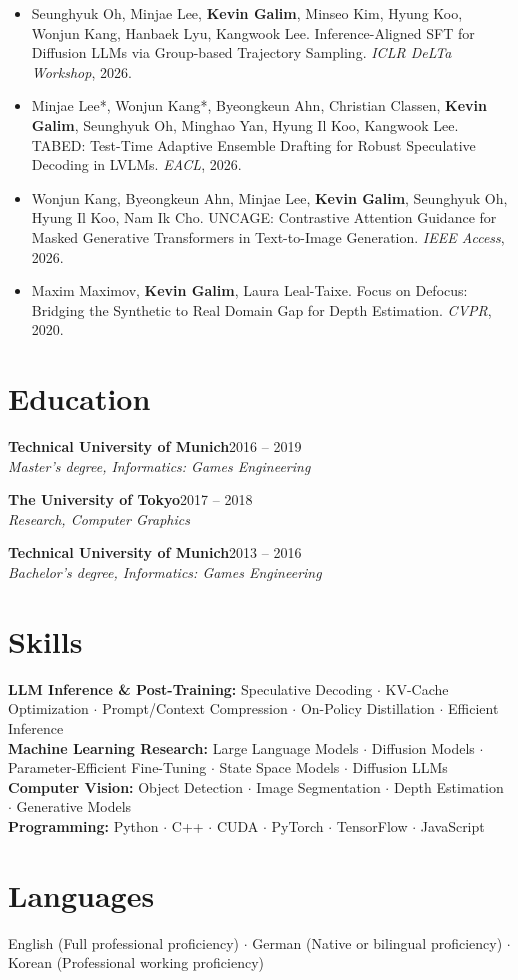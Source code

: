\documentclass[10pt,a4paper]{article}
\newcommand{\cvevent}[4]{%
  \noindent\textbf{#1}\hfill{\small\color{lightgray}#3}\\
  \textit{#2}\hfill{\small\color{lightgray}#4}
  \vspace{2pt}
}
\begin{document}
\begin{itemize}[leftmargin=1.2em]
  \item Seunghyuk Oh, Minjae Lee, \textbf{Kevin Galim}, Minseo Kim, Hyung Koo, Wonjun Kang, Hanbaek Lyu, Kangwook Lee.
Inference-Aligned SFT for Diffusion LLMs via Group-based Trajectory Sampling.
\textit{ICLR DeLTa Workshop}, 2026.
  \item Minjae Lee*, Wonjun Kang*, Byeongkeun Ahn, Christian Classen, \textbf{Kevin Galim}, Seunghyuk Oh, Minghao Yan, Hyung Il Koo, Kangwook Lee.
TABED: Test-Time Adaptive Ensemble Drafting for Robust Speculative Decoding in LVLMs.
\textit{EACL}, 2026.
  \item Wonjun Kang, Byeongkeun Ahn, Minjae Lee, \textbf{Kevin Galim}, Seunghyuk Oh, Hyung Il Koo, Nam Ik Cho.
UNCAGE: Contrastive Attention Guidance for Masked Generative Transformers in Text-to-Image Generation.
\textit{IEEE Access}, 2026.
  \item Maxim Maximov, \textbf{Kevin Galim}, Laura Leal-Taixe.
Focus on Defocus: Bridging the Synthetic to Real Domain Gap for Depth Estimation.
\textit{CVPR}, 2020.
\end{itemize}


\section{Education}
\cvevent{Technical University of Munich}{Master's degree, Informatics: Games Engineering}{2016 -- 2019}{}
\vspace{6pt}

\cvevent{The University of Tokyo}{Research, Computer Graphics}{2017 -- 2018}{}
\vspace{6pt}

\cvevent{Technical University of Munich}{Bachelor's degree, Informatics: Games Engineering}{2013 -- 2016}{}
\vspace{6pt}


\section{Skills}

\noindent
\textbf{LLM Inference \& Post-Training:} Speculative Decoding $\cdot$ KV-Cache Optimization $\cdot$ Prompt/Context Compression $\cdot$ On-Policy Distillation $\cdot$ Efficient Inference \\[2pt]
\textbf{Machine Learning Research:} Large Language Models $\cdot$ Diffusion Models $\cdot$ Parameter-Efficient Fine-Tuning $\cdot$ State Space Models $\cdot$ Diffusion LLMs \\[2pt]
\textbf{Computer Vision:} Object Detection $\cdot$ Image Segmentation $\cdot$ Depth Estimation $\cdot$ Generative Models \\[2pt]
\textbf{Programming:} Python $\cdot$ C++ $\cdot$ CUDA $\cdot$ PyTorch $\cdot$ TensorFlow $\cdot$ JavaScript
\section{Languages}
\noindent English (Full professional proficiency) $\cdot$ German (Native or bilingual proficiency) $\cdot$ Korean (Professional working proficiency)
\end{document}
